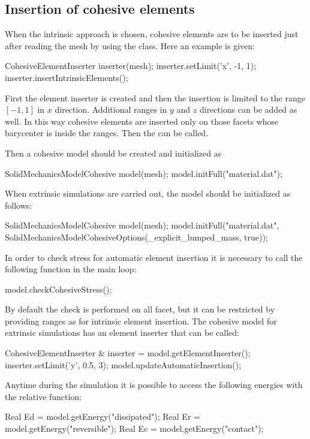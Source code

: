\subsection{Insertion of cohesive elements}
When the intrinsic approach is chosen, cohesive elements are to be
inserted just after reading the mesh by using the
 class. Here an example is given:
\begin{cpp}
  CohesiveElementInserter inserter(mesh);
  inserter.setLimit('x', -1, 1);
  inserter.insertIntrinsicElements();
\end{cpp}
First the element inserter is created and then the insertion is
limited to the range $[-1,1]$ in $x$ direction. Additional ranges in
$y$ and $z$ directions can be added as well. In this way cohesive
elements are inserted only on those facets whose barycenter is inside
the ranges. Then the  can be called.

Then a cohesive model should be created and initialized as
\begin{cpp}
  SolidMechanicsModelCohesive model(mesh);
  model.initFull("material.dat");
\end{cpp}

When extrinsic simulations are carried out, the model should be
initialized as follows:
\begin{cpp}
  SolidMechanicsModelCohesive model(mesh);
  model.initFull("material.dat", SolidMechanicsModelCohesiveOptions(_explicit_lumped_mass, true));
\end{cpp}
In order to check stress for automatic element insertion it is
necessary to call the following function in the main loop:
\begin{cpp}
  model.checkCohesiveStress();
\end{cpp}
By default the check is performed on all facet, but it can be
restricted by providing ranges as for intrinsic element insertion. The
cohesive model for extrinsic simulations has an element inserter that
can be called:
\begin{cpp}
  CohesiveElementInserter & inserter = model.getElementInserter();
  inserter.setLimit('y', 0.5, 3);
  model.updateAutomaticInsertion();
\end{cpp}

Anytime during the simulation it is possible to access the following
energies with the relative function:
\begin{cpp}
  Real Ed = model.getEnergy("dissipated");
  Real Er = model.getEnergy("reversible");
  Real Ec = model.getEnergy("contact");
\end{cpp}
